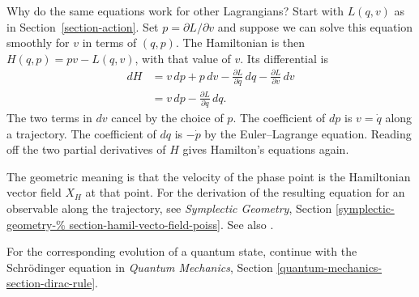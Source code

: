 Why do the same equations work for other
Lagrangians? Start with $L(q,v)$ as in
Section~\ref{section-action}. Set
$p=\partial L/\partial v$ and suppose
we can solve this equation smoothly for
$v$ in terms of $(q,p)$. The Hamiltonian
is then $H(q,p)=pv-L(q,v)$, with that
value of $v$. Its differential is
$$
\begin{aligned}
dH &= v\,dp+p\,dv
      -\frac{\partial L}{\partial q}\,dq
      -\frac{\partial L}{\partial v}\,dv\\
   &= v\,dp
      -\frac{\partial L}{\partial q}\,dq.
\end{aligned}
$$
The two terms in $dv$ cancel by the
choice of $p$. The coefficient of $dp$
is $v=\dot q$ along a trajectory. The
coefficient of $dq$ is $-\dot p$ by the
Euler--Lagrange equation. Reading off
the two partial derivatives of $H$ gives
Hamilton's equations again.

The geometric meaning is that the velocity
of the phase point is the Hamiltonian
vector field $X_H$ at that point. For the
derivation of the resulting equation for
an observable along the trajectory, see
\emph{Symplectic Geometry}, Section
\ref{symplectic-geometry-%
section-hamil-vecto-field-poiss}.
See also \cite[Section 2.5, Eq.~(2.25)
and Proposition~2.25]{hallq}.

For the corresponding evolution of a
quantum state, continue with the
Schr\"odinger equation in
\emph{Quantum Mechanics}, Section
\ref{quantum-mechanics-section-dirac-rule}.





